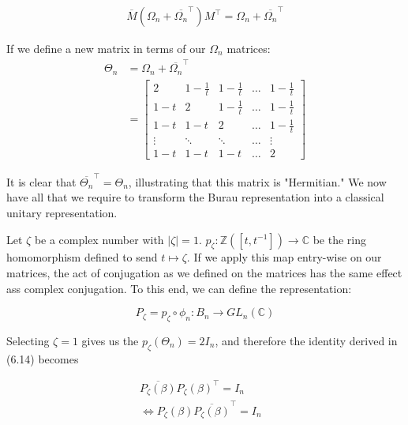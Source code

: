 \documentclass[10pt]{ucthesis}
\newcommand{\Z}{\mathbb{Z}}
\newcommand{\C}{\mathbb{C}}
\begin{document}
\begin{equation}
	\begin{aligned}
		\overline{M}(\Omega_n + \overline{\Omega_n}^\intercal )M^\intercal = \Omega_n + \overline{\Omega_n}^\intercal 
	\end{aligned}
\end{equation}

If we define a new matrix in terms of our $\Omega_n$ matrices:
\begin{equation}
	\begin{aligned}
		\Theta_n &= \Omega_n + \overline{\Omega_n}^\intercal \\
					&=  \begin{bmatrix}
						2 & 1-\frac{1}{t} & 1-\frac{1}{t} &\hdots & 1-\frac{1}{t} \\
						1-t & 2 & 1-\frac{1}{t} & \hdots & 1-\frac{1}{t} \\
						1-t & 1-t & 2 & \hdots & 1-\frac{1}{t} \\
						\vdots&\ddots&\ddots&\hdots&\vdots\\
						1-t & 1-t & 1-t & \hdots & 2
					\end{bmatrix}
	\end{aligned}
\end{equation}

It is clear that $\overline{\Theta_n}^\intercal = \Theta_n$, illustrating that this matrix is "Hermitian." We now have all that we require to transform the Burau representation into a classical unitary representation.

Let $\zeta$ be a complex number with $|\zeta|=1$. $p_\zeta:\Z([t,t^{-1}]) \rightarrow \C$ be the ring homomorphism defined to send $t\mapsto\zeta$. If we apply this map entry-wise on our matrices, the act of conjugation as we defined on the matrices has the same effect ass complex conjugation. To this end, we can define the representation:

$$P_\zeta = p_\zeta\circ\phi_n: B_n\rightarrow GL_n(\C)$$

Selecting $\zeta=1$ gives us the $p_\zeta(\Theta_n) = 2I_n$, and therefore the identity derived in (6.14) becomes

\begin{equation}
	\begin{aligned}
		\overline{P_\zeta(\beta)}P_\zeta(\beta)^\intercal = I_n &\\
		\Leftrightarrow P_\zeta(\beta)\overline{P_\zeta(\beta)}^\intercal  = I_n
	\end{aligned}
\end{equation}
\end{document}
